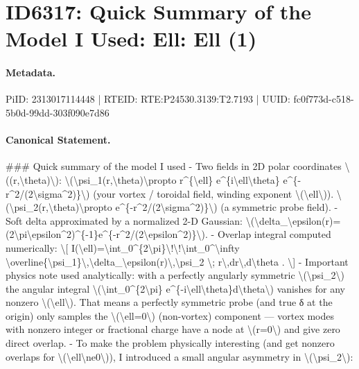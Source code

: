 \section*{ID6317: Quick Summary of the Model I Used: Ell: Ell (1)}
\paragraph{Metadata.}
PiID: 2313017114448 | RTEID: RTE:P24530.3139:T2.7193 | UUID: fc0f773d-c518-5b0d-99dd-303f090e7d86

\paragraph{Canonical Statement.}
\#\#\# Quick summary of the model I used - Two fields in 2D polar coordinates \textbackslash{}((r,\textbackslash{}theta)\textbackslash{}): \textbackslash{}(\textbackslash{}psi\_1(r,\textbackslash{}theta)\textbackslash{}propto r\textasciicircum{}\{\textbackslash{}ell\} e\textasciicircum{}\{i\textbackslash{}ell\textbackslash{}theta\} e\textasciicircum{}\{-r\textasciicircum{}2/(2\textbackslash{}sigma\textasciicircum{}2)\}\textbackslash{}) (your vortex / toroidal field, winding exponent \textbackslash{}(\textbackslash{}ell\textbackslash{})). \textbackslash{}(\textbackslash{}psi\_2(r,\textbackslash{}theta)\textbackslash{}propto e\textasciicircum{}\{-r\textasciicircum{}2/(2\textbackslash{}sigma\textasciicircum{}2)\}\textbackslash{}) (a symmetric probe field). - Soft delta approximated by a normalized 2-D Gaussian: \textbackslash{}(\textbackslash{}delta\_\textbackslash{}epsilon(r)=(2\textbackslash{}pi\textbackslash{}epsilon\textasciicircum{}2)\textasciicircum{}\{-1\}e\textasciicircum{}\{-r\textasciicircum{}2/(2\textbackslash{}epsilon\textasciicircum{}2)\}\textbackslash{}). - Overlap integral computed numerically: \textbackslash{}[ I(\textbackslash{}ell)=\textbackslash{}int\_0\textasciicircum{}\{2\textbackslash{}pi\}\textbackslash{}!\textbackslash{}!\textbackslash{}int\_0\textasciicircum{}\textbackslash{}infty \textbackslash{}overline\{\textbackslash{}psi\_1\}\textbackslash{},\textbackslash{}delta\_\textbackslash{}epsilon(r)\textbackslash{},\textbackslash{}psi\_2 \textbackslash{}; r\textbackslash{},dr\textbackslash{},d\textbackslash{}theta . \textbackslash{}] - Important physics note used analytically: with a perfectly angularly symmetric \textbackslash{}(\textbackslash{}psi\_2\textbackslash{}) the angular integral \textbackslash{}(\textbackslash{}int\_0\textasciicircum{}\{2\textbackslash{}pi\} e\textasciicircum{}\{-i\textbackslash{}ell\textbackslash{}theta\}d\textbackslash{}theta\textbackslash{}) vanishes for any nonzero \textbackslash{}(\textbackslash{}ell\textbackslash{}). That means a perfectly symmetric probe (and true δ at the origin) only samples the \textbackslash{}(\textbackslash{}ell=0\textbackslash{}) (non-vortex) component — vortex modes with nonzero integer or fractional charge have a node at \textbackslash{}(r=0\textbackslash{}) and give zero direct overlap. - To make the problem physically interesting (and get nonzero overlaps for \textbackslash{}(\textbackslash{}ell\textbackslash{}ne0\textbackslash{})), I introduced a small angular asymmetry in \textbackslash{}(\textbackslash{}psi\_2\textbackslash{}): 